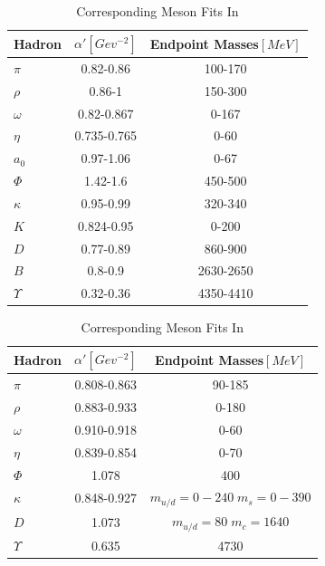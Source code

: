 \documentclass[11pt,a4paper]{article}
\begin{document}
\begin{table}[h]
\centering
\begin{tabular}{|l|c|c|}
\hline
Hadron & $\alpha '\left[Gev^{-2}\right]$ & Endpoint Masses$\left[MeV\right]$ \\ \hline
$\pi$ & 0.82-0.86 & 100-170 \\
$\rho$  & 0.86-1 & 150-300 \\
$\omega$  & 0.82-0.867 & 0-167 \\
$\eta$  & 0.735-0.765 & 0-60 \\
$a_0$ & 0.97-1.06 & 0-67 \\
$\Phi$  & 1.42-1.6 & 450-500 \\
$\kappa$  & 0.95-0.99 & 320-340 \\
$K$ & 0.824-0.95 & 0-200 \\
$D$ & 0.77-0.89 & 860-900 \\
$B$ & 0.8-0.9 & 2630-2650 \\
$\varUpsilon$  & 0.32-0.36 & 4350-4410 \\
\hline
\end{tabular}
\caption{Meson Fits Summary Table. Endpoint mass is the same on both endpoints.}
\label{tab:mesonsum}

\centering
\begin{tabular}{|l|c|c|}
\hline
Hadron & $\alpha '\left[Gev^{-2}\right]$ & Endpoint Masses$\left[MeV\right]$ \\ \hline
$\pi$ & 0.808-0.863 & 90-185 \\
$\rho$  & 0.883-0.933 & 0-180 \\
$\omega$  & 0.910-0.918 & 0-60 \\
$\eta$  & 0.839-0.854 & 0-70 \\
$\Phi$  & 1.078 & 400 \\
$\kappa$  & 0.848-0.927 & $m_{u/d}=0-240\; m_s=0-390$ \\
$D$ & 1.073 & $m_{u/d}=80\; m_c=1640$ \\
$\varUpsilon$  & 0.635 & 4730 \\
\hline
\end{tabular}
\caption{Corresponding Meson Fits In \cite{Sonnenschein14}}
\label{tab:mesonsumdorin}
\end{table}
\end{document}
